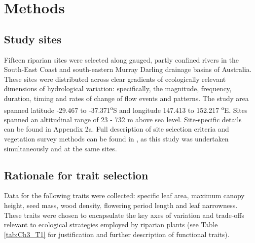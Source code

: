 \section{Methods}
\subsection{Study sites}
Fifteen riparian sites were selected along gauged, partly confined rivers in the South-East Coast and south-eastern Murray Darling drainage basins of Australia. These sites were distributed across clear gradients of ecologically relevant dimensions of hydrological variation: specifically, the magnitude, frequency, duration, timing and rates of change of flow events and patterns. The study area spanned latitude -29.467 to -37.371\textsuperscript {o}S and longitude 147.413 to 152.217 \textsuperscript{o}E. Sites spanned an altitudinal range of 23 - 732 m above sea level. Site-specific details can be found in Appendix 2a.  Full description of site selection criteria and vegetation survey methods can be found in \citep{Lawson2015}, as this study was undertaken simultaneously and at the same sites.

\subsection{Rationale for trait selection}
Data for the following traits were collected: specific leaf area, maximum canopy height, seed mass, wood density, flowering period length and leaf narrowness. These traits were chosen to encapsulate the key axes of variation and trade-offs relevant to ecological strategies employed by riparian plants (see Table \ref{tab:Ch3_T1} for justification and further description of functional traits).

